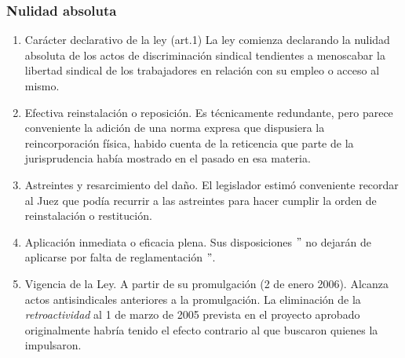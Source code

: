 \documentclass[spanish,12pt,a4paper,titlepage]{report}
\begin{document}
\subsubsection{Nulidad absoluta}
\begin{enumerate}
\item Carácter declarativo de la ley (art.1) La ley comienza declarando la nulidad absoluta de los actos de discriminación sindical tendientes a menoscabar la libertad sindical de los trabajadores en relación con su empleo o acceso al mismo.

\item Efectiva reinstalación o reposición. Es técnicamente redundante, pero parece conveniente la adición de una norma expresa que dispusiera la reincorporación física, habido cuenta de la reticencia que parte de la jurisprudencia había mostrado en el pasado en esa materia.

\item Astreintes y resarcimiento del daño. El legislador estimó conveniente recordar al Juez que podía recurrir a las astreintes para hacer cumplir la orden de reinstalación o restitución. 

\item Aplicación inmediata o eficacia plena. Sus disposiciones $"$ no dejarán de aplicarse por falta de reglamentación $"$.

\item Vigencia de la Ley. A partir de su promulgación (2 de enero 2006). Alcanza actos antisindicales anteriores a la promulgación. La eliminación de la \textit{retroactividad} al 1 de marzo de 2005 prevista en el proyecto aprobado originalmente habría tenido el efecto contrario al que buscaron quienes la impulsaron. 
\end{enumerate}
\end{document}
